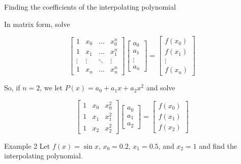 \documentclass[12pt]{beamer}
\begin{document}
\begin{frame}{Finding the coefficients of the interpolating polynomial} 

In matrix form, solve

\[
\begin{bmatrix}
    1       & x_0 & \dots & x_0^n \\
   1       & x_1 & \dots & x_1^n \\
    \vdots & \vdots & \ddots & \vdots \\
   1       & x_n & \dots & x_n^n
\end{bmatrix}
\begin{bmatrix}
    a_0 \\
    a_1  \\
    \vdots \\
    a_n 
\end{bmatrix}
=
\begin{bmatrix}
   f(x_0) \\
  f(x_1)  \\
    \vdots \\
    f(x_n) 
\end{bmatrix}
\]

So, if $n=2$, we let $P(x) = a_0 + a_1x + a_2x^2$ and solve

\[
\begin{bmatrix}
    1       & x_0 &  x_0^2 \\
   1       & x_1 &  x_1^2 \\
   1       & x_2 &  x_2^2
\end{bmatrix}
\begin{bmatrix}
    a_0 \\
    a_1  \\
    a_2 
\end{bmatrix}
=
\begin{bmatrix}
   f(x_0) \\
  f(x_1)  \\
    f(x_2) 
\end{bmatrix}
\]
\end{frame} 

\begin{frame}{Example 2}
Let $f(x) = \sin x$, $x_0 = 0.2$, $x_1 = 0.5$, and $x_2 = 1$ and find the interpolating polynomial.
\vspace{3 in}
\end{frame}
\end{document}
